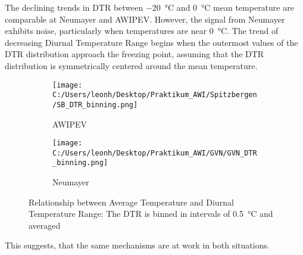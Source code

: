 The declining trends in DTR between \SI{-20}{\degreeCelsius} and \SI{0}{\degreeCelsius} mean temperature are comparable at Neumayer and AWIPEV. However, the signal from Neumayer exhibits noise, particularly when temperatures are near \SI{0}{\degreeCelsius}. The trend of decreasing Diurnal Temperature Range begins when the outermost values of the DTR distribution approach the freezing point, assuming that the DTR distribution is symmetrically centered around the mean temperature.
\begin{figure}[ht]
    \centering
    \begin{subfigure}[t]{0.49\textwidth}
        \centering
        \texttt{[image: C:/Users/leonh/Desktop/Praktikum\_AWI/Spitzbergen/SB\_DTR\_binning.png]}
        \caption{AWIPEV}
        \label{subfig:DTRbinningAWIPEV}
    \end{subfigure}
    \hfil
    \begin{subfigure}[t]{0.49\textwidth}
        \centering
        \texttt{[image: C:/Users/leonh/Desktop/Praktikum\_AWI/GVN/GVN\_DTR\_binning.png]}
        \caption{Neumayer}
        \label{subfig:DTRbinningNeumayer}
    \end{subfigure}
    \caption{Relationship between Average Temperature and Diurnal Temperature Range: The DTR is binned in intervals of \SI{0.5}{\celsius} and averaged }
    \label{fig:DTRbinning}
\end{figure}
This suggests, that the same mechanisms are at work in both situations.  


